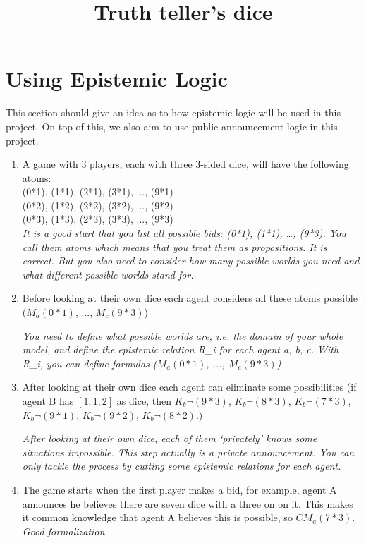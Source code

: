 \documentclass{article}
\title{Truth teller's dice}
\begin{document}
\maketitle
\section{Using Epistemic Logic}
This section should give an idea as to how epistemic logic will be used in this project. On top of this, we also aim to use public announcement logic in this project.
\begin{enumerate}
    \item A game with 3 players, each with three 3-sided dice, will have the following atoms:\\
    (0*1), (1*1), (2*1), (3*1), ..., (9*1)\\
    (0*2), (1*2), (2*2), (3*2), ..., (9*2)\\
    (0*3), (1*3), (2*3), (3*3), ..., (9*3)\\
    
    \textit{It is a good start that you list all possible bids: (0*1), (1*1), …, (9*3). You call them atoms which means that you treat them as propositions. It is correct. But you also need to consider how many possible worlds you need and what different possible worlds stand for.}
    
    \item Before looking at their own dice each agent considers all these atoms possible ($M_a(0*1)$, ..., $M_c(9*3)$)
    
    \textit{You need to define what possible worlds are, i.e. the domain of your whole model, and define the epistemic relation R\_i for each agent a, b, c. With R\_i, you can define formulas ($M_a(0*1)$, ..., $M_c(9*3)$)}
    
    \item After looking at their own dice each agent can eliminate some possibilities (if agent B has $[1, 1, 2]$ as dice, then $K_b \neg (9 * 3)$, $K_b \neg (8 * 3)$, $K_b \neg (7 * 3)$, $K_b \neg (9 * 1)$, $K_b \neg (9 * 2)$, $K_b \neg (8 * 2)$.)
    
    \textit{After looking at their own dice, each of them ‘privately’ knows some situations impossible. This step actually is a private announcement. You can only tackle the process by cutting some epistemic relations for each agent. }
    
    \item The game starts when the first player makes a bid, for example, agent A announces he believes there are seven dice with a three on on it. This makes it common knowledge that agent A believes this is possible, so $CM_a(7 * 3)$.
    \textit{Good formalization.}
    

\end{enumerate}
\end{document}
